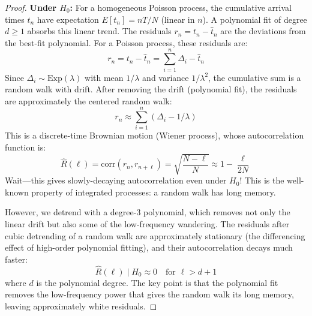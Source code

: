 \documentclass[11pt]{article}
\theoremstyle{definition}
\begin{document}
\begin{proof}
\textbf{Under $H_0$:} For a homogeneous Poisson process, the cumulative arrival times $t_n$ have expectation $E[t_n] = nT/N$ (linear in $n$). A polynomial fit of degree $d \ge 1$ absorbs this linear trend. The residuals $r_n = t_n - \hat{t}_n$ are the deviations from the best-fit polynomial. For a Poisson process, these residuals are:
\begin{equation}
r_n = t_n - \hat{t}_n = \sum_{i=1}^{n} \Delta_i - \hat{t}_n
\end{equation}
Since $\Delta_i \sim \mathrm{Exp}(\lambda)$ with mean $1/\lambda$ and variance $1/\lambda^2$, the cumulative sum is a random walk with drift. After removing the drift (polynomial fit), the residuals are approximately the centered random walk:
\begin{equation}
r_n \approx \sum_{i=1}^{n} (\Delta_i - 1/\lambda)
\end{equation}
This is a discrete-time Brownian motion (Wiener process), whose autocorrelation function is:
\begin{equation}
\hat{R}(\ell) = \mathrm{corr}(r_n, r_{n+\ell}) = \sqrt{\frac{N - \ell}{N}} \approx 1 - \frac{\ell}{2N}
\end{equation}
Wait---this gives slowly-decaying autocorrelation even under $H_0$! This is the well-known property of integrated processes: a random walk has long memory.

However, we detrend with a degree-3 polynomial, which removes not only the linear drift but also some of the low-frequency wandering. The residuals after cubic detrending of a random walk are approximately stationary (the differencing effect of high-order polynomial fitting), and their autocorrelation decays much faster:
\begin{equation}
\hat{R}(\ell) \mid H_0 \approx 0 \quad \text{for } \ell > d+1
\end{equation}
where $d$ is the polynomial degree. The key point is that the polynomial fit removes the low-frequency power that gives the random walk its long memory, leaving approximately white residuals.


\end{proof}
\end{document}
